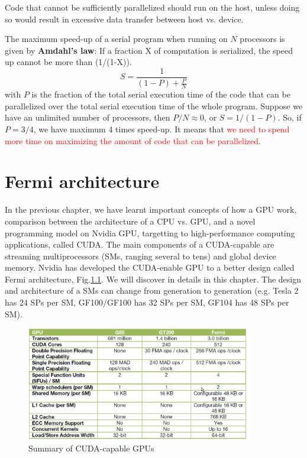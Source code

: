 \begin{framed}
  Code that cannot be sufficiently parallelized should run on the host,
  unless doing so would result in excessive data transfer between host
  vs. device. 
\end{framed}

The maximum speed-up of a serial program when running on $N$
processors is given by {\bf Amdahl's law}: If a fraction X of
computation is serialized, the speed up cannot be more than (1/(1-X)).
\begin{equation}
  \label{eq:2}
  S = \frac{1}{(1-P) + \frac{P}{N}}
\end{equation}
with $P$ is the fraction of the total serial execution time of the
code that can be parallelized over the total serial execution time of
the whole program. Suppose we have an unlimited number of processors,
then $P/N\approx 0$, or $S=1/(1-P)$. So, if $P=3/4$, we have maximum 4
times speed-up. It means that
\textcolor{red}{we need to spend more time on maximizing the amount of
  code that can be parallelized}.
\chapter{Fermi architecture}
\label{chap:fermi-architecture}

In the previous chapter, we have learnt important concepts of how a GPU work,
comparison between the architecture of a CPU vs. GPU, and a novel programming
model on Nvidia GPU, targetting to high-performance computing applications,
called CUDA. The main components of a CUDA-capable are streaming multiprocessors
(SMs, ranging several to tens) and global device memory.
Nvidia has developed the CUDA-enable GPU to a better design called Fermi
architecture, Fig.\ref{fig:summary_GPU}. We will discover in details in this
chapter. The design and architecture of a SMs can change from generation to
generation (e.g. Tesla 2 has 24 SPs per SM, GF100/GF100 has 32 SPs per SM, GF104
has 48 SPs per SM).

\begin{figure}[hbt]
  \centerline{\includegraphics[height=5cm,
    angle=0]{./images/summary_GPU.eps}}
  \caption{Summary of CUDA-capable GPUs}
\label{fig:summary_GPU}
\end{figure}

